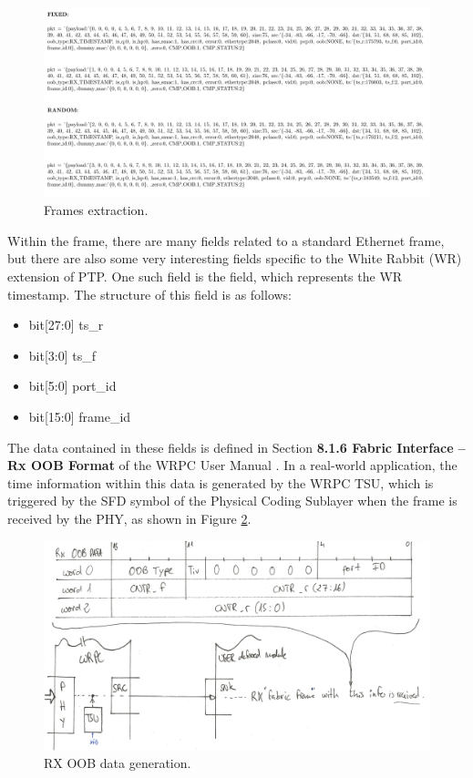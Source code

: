 \begin{figure}[H]
\centering
\includegraphics[width=14.5cm]{figures/frames.pdf}
\caption{Frames extraction.}
\label{fig:frame-res}
\end{figure}

\noindent Within the frame, there are many fields related to a standard Ethernet frame, but there are also some very interesting fields specific to the White Rabbit (WR) extension of PTP.
One such field is the  field, which represents the WR timestamp.
The structure of this field is as follows:

\begin{itemize}
\item bit[27:0] ts\_r
\item bit[3:0] ts\_f
\item bit[5:0] port\_id
\item bit[15:0] frame\_id
\end{itemize}

\noindent The data contained in these fields is defined in Section \textbf{8.1.6 Fabric Interface – Rx OOB Format} of the WRPC User Manual \cite{WR-core:manual}.
In a real-world application, the time information within this data is generated by the WRPC TSU, which is triggered by the SFD symbol of the Physical Coding Sublayer \cite{Tomasz-MSc} when the frame is received by the PHY, as shown in Figure \ref{fig:RX-OOB-data}.

\begin{figure}[H]
\centering
\includegraphics[width=14.5cm]{figures/OOB_RX_DATA.png}
\caption{RX OOB data generation.}
\label{fig:RX-OOB-data}
\end{figure}

